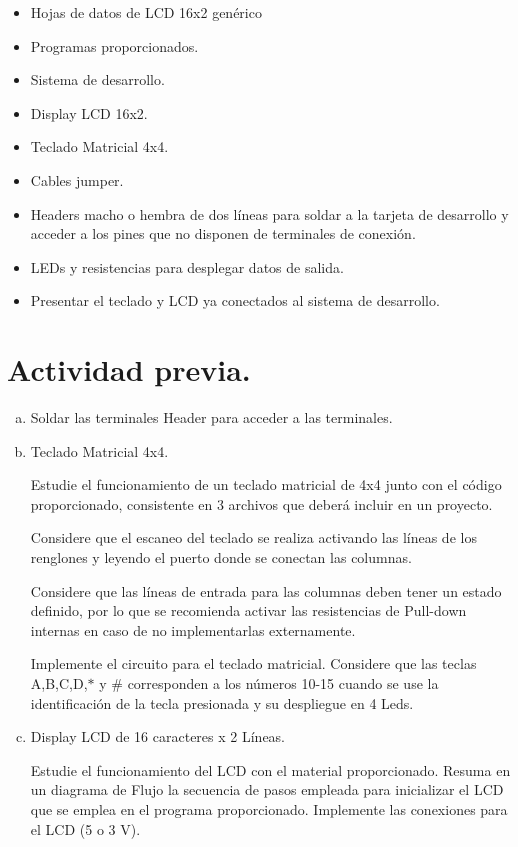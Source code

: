 \documentclass[a4paper,11pt]{article}                 %
\begin{document}
\begin{itemize}
	\item Hojas de datos de LCD 16x2 genérico 
	\item Programas proporcionados. 
	\item Sistema de desarrollo. 
	\item Display LCD 16x2. 
	\item Teclado Matricial 4x4.
	\item Cables jumper. 
	\item Headers macho o hembra de dos líneas para soldar a la tarjeta de desarrollo y acceder a los pines que no disponen de terminales de conexión. 
	\item LEDs y resistencias para desplegar datos de salida. 
	\item Presentar el teclado y LCD ya conectados al sistema de desarrollo.   
\end{itemize}
  

  
\section{Actividad previa.}                   

  \begin{enumerate}[a)]
	\item  Soldar las terminales Header para acceder a las terminales.  
	
	\item  Teclado Matricial 4x4. 
	
	Estudie el funcionamiento de un teclado matricial de 4x4 junto con el código proporcionado, consistente en 3 archivos que deberá incluir en un proyecto.  
	
	Considere que el escaneo del teclado se realiza activando las líneas de los renglones y leyendo el puerto donde se conectan las columnas. 
	
	Considere que las líneas de entrada para las columnas deben tener un estado definido, por lo que se recomienda activar las resistencias de Pull-down internas en caso de no implementarlas externamente. 
	
	Implemente el circuito para el teclado matricial. Considere que las teclas A,B,C,D,$*$ y \# corresponden a los números 10-15 cuando se use la identificación de la tecla presionada y su despliegue en 4 Leds.
	
	\item  Display LCD de 16 caracteres x 2 Líneas. 
	
	Estudie el funcionamiento del LCD con el material proporcionado. Resuma en un diagrama de Flujo la secuencia de pasos empleada para inicializar el LCD que se emplea en el programa proporcionado. Implemente las conexiones para el LCD (5 o 3 V). 
	
	
\end{enumerate}
\end{document}
